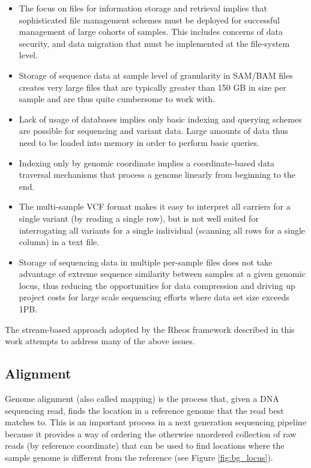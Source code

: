 \begin{itemize}
    \item The focus on files for information storage and retrieval implies that sophisticated file management schemes must be deployed for successful management of large cohorts of samples. This includes concerns of data security, and data migration that must be implemented at the file-system level.
    \item Storage of sequence data at sample level of granularity in SAM/BAM files creates very large files that are typically greater than 150 GB in size per sample and are thus quite cumbersome to work with.
    \item Lack of usage of databases implies only basic indexing and querying schemes are possible for sequencing and variant data. Large amounts of data thus need to be loaded into memory in order to perform basic queries.
    \item Indexing only by genomic coordinate implies a coordinate-based data traversal mechanisms that process a genome linearly from beginning to the end.
    \item The multi-sample VCF format makes it easy to interpret all carriers for a single variant (by reading a single row), but is not well suited for interrogating all variants for a single individual (scanning all rows for a single column) in a text file.
    \item Storage of sequencing data in multiple per-sample files does not take advantage of extreme sequence similarity between samples at a given genomic locus, thus reducing the opportunities for data compression and driving up project costs for large scale sequencing efforts where data set size exceeds 1PB.
\end{itemize}

The stream-based approach adopted by the Rheos framework described in this work attempts to address many of the above issues.

\subsection{Alignment}
\label{sec:bg_alignment}

Genome alignment (also called mapping) is the process that, given a DNA sequencing read, finds the location in a reference genome that the read best matches to. This is an important process in a next generation sequencing pipeline because it provides a way of ordering the otherwise unordered collection of raw reads (by reference coordinate) that can be used to find locations where the sample genome is different from the reference (see Figure \ref{fig:bg_locus}). 

